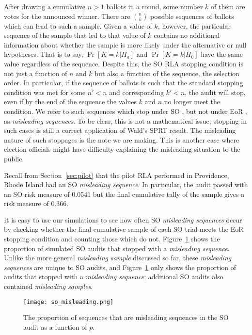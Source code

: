 After drawing a cumulative $n>1$ ballots in a round, some number $k$ of them are votes for the announced winner. There are $\binom{n}{k}$ possible sequences of ballots which can lead to such a sample. Given a value of $k$, however, the particular sequence of the sample that led to that value of $k$ contains no additional information about whether the sample is more likely under the alternative or null hypotheses. That is to say, $\Pr[K=k|H_a]$ and $\Pr[K=k|H_0]$ have the same value regardless of the sequence.
Despite this, the SO \BRAVO RLA stopping condition is not just a function of $n$ and $k$ but also a function of the sequence, the selection order. In particular, if the sequence of ballots is such that the standard \BRAVO stopping condition was met for some $n'<n$ and corresponding $k'<n$, the audit will stop, even if by the end of the sequence the values $k$ and $n$ no longer meet the \BRAVO condition. We refer to such sequences which stop under SO \BRAVO, but not under EoR \BRAVO, as \emph{misleading sequences}. To be clear, this is not a mathematical issue; stopping in such cases is still a correct application of Wald's SPRT result\cite{wald}. The misleading nature of such stoppages is the note we are making. This is another case where election officials might have difficulty explaining the misleading situation to the public.

Recall from Section~\ref{sec:pilot} that the pilot \Providence RLA performed in Providence, Rhode Island had an SO \BRAVO \emph{misleading sequence}. In particular, the audit passed with an SO \BRAVO risk measure of $0.0541$ but the final cumulative tally of the sample gives a \BRAVO risk measure of $0.366$.

It is easy to use our simulations to see how often SO \BRAVO \emph{misleading sequences} occur by checking whether the final cumulative sample of each SO \BRAVO trial meets the EoR \BRAVO stopping condition and counting those which do not. Figure~\ref{so_misleading} shows the proportion of simulated SO \BRAVO audits that stopped with a \emph{misleading sequence}. Unlike the more general \emph{misleading sample} discussed so far, these \emph{misleading sequences} are unique to SO \BRAVO audits, and Figure~\ref{so_misleading} only shows the proportion of audits that stopped with a \emph{misleading sequence}; additional SO \BRAVO audits also contained \emph{misleading samples}.

\begin{figure}
\texttt{[image: so\_misleading.png]}
\caption{The proportion of sequences that are misleading sequences in the SO \BRAVO audit as a function of $p$.}
\label{so_misleading}
\end{figure}




